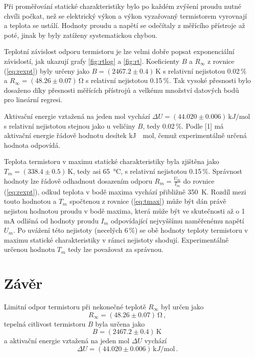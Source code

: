\documentclass{../concepts/prepareprotokol} %
\begin{document}
Při proměřování statické charakteristiky bylo po každém zvýšení proudu nutné chvíli počkat, než se elektrický výkon a výkon vyzařovaný termistorem vyrovnají a teplota se ustálí. Hodnoty proudu a napětí se odečítaly z měřícího přístroje až poté, jinak by byly zatíženy systematickou chybou.

Teplotní závislost odporu termistoru je lze velmi dobře popsat exponenciální závislostí, jak ukazují grafy \ref{fig:rtlog} a \ref{fig:rt}. Koeficienty $B$ a $R_\infty$ z rovnice (\ref{eq:rexpt}) byly určeny jako $B = (2467.2 \pm 0.4) \, \si{\kelvin}$ s relativní nejistotou 0.02\,\% a $R_\infty = (48.26 \pm 0.07) \, \si{\ohm}$ s relativní nejistotou 0.15\,\%. Tak vysoké přesnosti bylo dosaženo díky přesnosti měřících přístrojů a velkému množství datových bodů pro lineární regresi.

Aktivační energie vztažená na jeden mol vychází $\Delta U = (44.020 \pm 0.006) \, \si{\kilo J \per\mole}$ s relativní nejistotou stejnou jako u veličiny $B$, tedy 0.02\,\%. Podle [1] má aktivační energie řádově hodnotu desítek \si{\kilo J \per \mole}, čemuž experimentálně určená hodnota odpovídá.

Teplota termistoru v maximu statické charakteristiky byla zjištěna jako $T_m = (338.4 \pm 0.5) \, \si{\kelvin}$, tedy asi \SI{65}{\celsius}, s relativní nejistotou 0.15\,\%. Správnost hodnoty lze řádově odhadnout dosazením odporu $R_m = \frac{U_m}{I_m}$ do rovnice (\ref{eq:rexpt}), odkud teplota v bodě maxima vychází přibližně \SI{350}{\kelvin}. Rozdíl mezi touto hodnotou a $T_m$ spočtenou z rovnice (\ref{eq:tmax}) může být dán právě nejistou hodnotou proudu v bodě maxima, která může být ve skutečnosti až o 1 mA odlišná od hodnoty proudu $I_m$ odpovídající nejvyššímu naměřenému napětí $U_m$. Po uvážení této nejistoty (necelých 6\,\%) se obě hodnoty teploty termistoru v maximu statické charakteristiky v rámci nejistoty shodují. Experimentálně určenou hodnotu $T_m$ tedy lze považovat za správnou.

\section{Závěr}

Limitní odpor termistoru při nekonečné teplotě $R_\infty$ byl určen jako
\begin{equation*}
    R_\infty = (48.26 \pm 0.07) \, \si{\ohm} \, ,
\end{equation*}
tepelná citlivost termistoru $B$ byla určena jako
\begin{equation*}
    B = (2467.2 \pm 0.4) \, \si{\kelvin} \,
\end{equation*}
a aktivační energie vztažená na jeden mol $\Delta U$ vychází
\begin{equation*}
    \Delta U = (44.020 \pm 0.006) \, \si{\kilo J \per\mole} \, .
\end{equation*}
\end{document}

